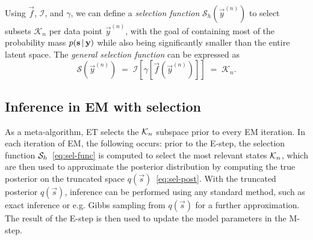 Using $\vec{f}$, 
$\mathcal{I}$, and $\gamma$, we can define a \emph{selection function}
$\mathcal{S}_h(\vec{y}^{(n)})$ to select subsets $\mathcal{K}_n$ per data point
$\vec{y}^{(n)}$, with the goal of containing most of the probability mass
$p({\mathbf{s}} \, | \, {\mathbf{y}})$ while also being significantly smaller than the entire
latent space.  
%
The \textit{general selection function}  can be expressed as
%
\vspace{-.1cm}
\begin{equation}\label{eq:sel-func}
\mathcal{S}(\vec{y}^{(n)}) \;=\; \mathcal{I} \left[  \gamma \left[ \vec{f}(\vec{y}^{(n)}) \right]  \right] \;=\; \mathcal{K}_n.
\end{equation}
%


\subsection{Inference in EM with selection}
%
As a meta-algorithm, ET selects the $\mathcal{K}_{n}$ subspace prior to every EM iteration.
In each iteration of EM, the following occurs: 
prior to the E-step, the selection function $\mathcal{S}_{h}$~\eqref{eq:sel-func} is computed to select the most relevant states $\mathcal{K}_{n}$, 
which are then used to approximate the posterior distribution by computing the true posterior on the truncated space $q(\vec{s})$~\eqref{eq:sel-post}.
With the truncated posterior $q(\vec{s})$, inference can be performed using any standard method, such as exact inference or e.g. Gibbs sampling from $q(\vec{s})$ for a further approximation. %
The result of the E-step is then used to update the model parameters in the M-step. 



